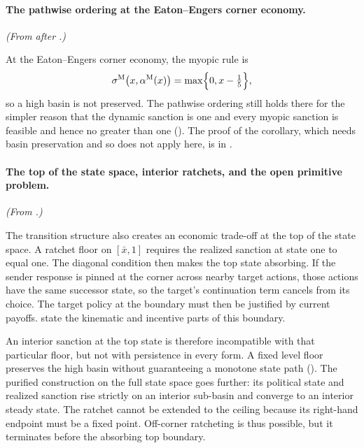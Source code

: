 \paragraph{The pathwise ordering at the Eaton--Engers corner economy.} \emph{(From after .)}

At the Eaton--Engers corner economy, the myopic
rule is
\begin{equation}
\sigma^{\mathrm{M}}\bigl(x,\alpha^{\mathrm{M}}(x)\bigr)
=\max\Bigl\{0,x-\tfrac15\Bigr\},
\label{eq:ee-myopic-rule}
\end{equation}
so a high basin is not preserved. The pathwise ordering still holds there
for the simpler reason that the dynamic sanction is one and every
myopic sanction is feasible and hence no greater than one
(). The proof of the corollary, which needs basin
preservation and so does not apply here, is in .

\paragraph{The top of the state space, interior ratchets, and the open primitive problem.} \emph{(From .)}

The transition structure also creates an economic trade-off at the top
of the state space. A ratchet floor on $[\bar x,1]$ requires the realized
sanction at state one to equal one. The diagonal condition then makes the
top state absorbing. If the sender response is pinned at the corner
across nearby target actions, those actions have the same successor
state, so the target's continuation term cancels from its choice. The
target policy at the boundary must then be justified by current payoffs.
 state the
kinematic and incentive parts of this boundary.

An interior sanction at the top state is therefore incompatible with
that particular floor, but not with persistence in every form. A fixed
level floor preserves the high basin without guaranteeing a monotone
state path (). The purified construction on the
full state space goes further: its political state and realized sanction
rise strictly on an interior sub-basin and converge to an interior steady
state. The ratchet cannot be extended to the ceiling because its
right-hand endpoint must be a fixed point. Off-corner ratcheting is thus
possible, but it terminates before the absorbing top boundary.

